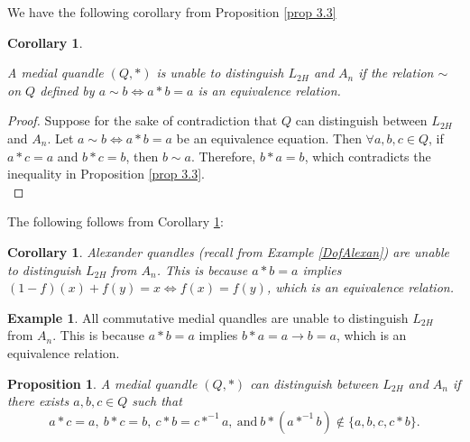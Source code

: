 \documentclass[12pt, letterpaper]{article}
\theoremstyle{plain}
\newtheorem{cor}[theorem]{Corollary}
\newtheorem{prop}[theorem]{Proposition}
\theoremstyle{definition}
\newtheorem{example}[theorem]{Example}
\begin{document}
We have the following corollary from Proposition \ref{prop 3.3}
\begin{cor}   \label{cor 3}

A medial quandle $(Q,*)$ is unable to distinguish $L_{2H}$ and $A_n$ if the relation $\sim$ on $Q$ defined by $a\sim b\Leftrightarrow a*b=a$ is an equivalence relation. \end{cor} \begin{proof}
Suppose for the sake of contradiction that $Q$ can distinguish between $L_{2H}$ and $A_n$.  Let $a\sim b\Leftrightarrow a*b=a$ be an equivalence equation. Then $\forall a,b,c\in Q$, if $a*c=a$ and $b*c=b$, then $b\sim a$. Therefore, $b*a=b$, which contradicts the inequality in Proposition \ref{prop 3.3}. \\ \end{proof}


The following follows from Corollary \ref{cor 3}:
\begin{cor}
    
 \label{coro_failofAlexanderquandle} Alexander quandles (recall from Example \ref{DofAlexan})  are unable to distinguish $L_{2H}$ from $A_n$. This is because $a*b=a$ implies $(1-f)(x)+f(y)=x\Leftrightarrow f(x)=f(y)$, which is an equivalence relation. \end{cor}


\begin{example} All commutative medial quandles are unable to distinguish $L_{2H}$ from $A_n$. This is because $a*b=a$ implies $b*a=a\to b=a$, which is an equivalence relation. \end{example}


\begin{prop} \label{prop 3.5}
 A medial quandle $(Q,*)$ can distinguish between $L_{2H}$ and $A_n$ if there exists $a,b,c\in Q$ such that\\
$$a*c=a,\ b*c=b,\ c*b=c*^{-1}a,\ \text{and} \ b*(a*^{-1}b)\notin \{a,b,c,c*b\}.$$ \end{prop}
\end{document}
